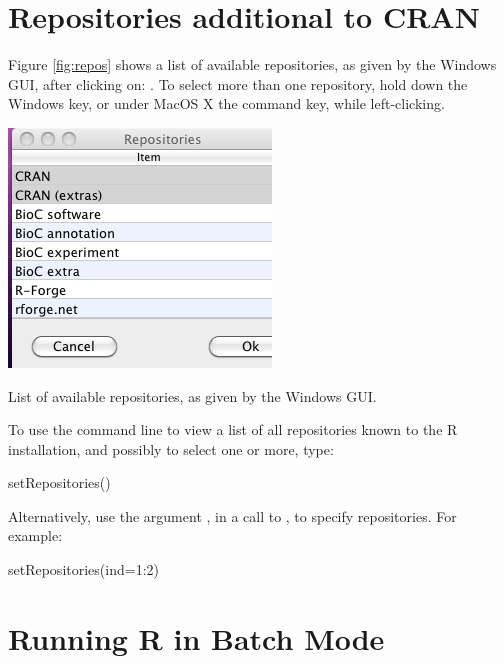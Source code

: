 \section{Repositories additional to CRAN}\label{sec:repos}

Figure \ref{fig:repos} shows a list of available repositories, as given by
the Windows GUI, after clicking on:
\txtt{|}.
To select more than one repository, hold down the Windows key, or
under MacOS X the command key, while left-clicking.

\begin{marginfigure}
\includegraphics{figs-inc/16i-repos.jpg}
\caption{List of available repositories, as given by the Windows
  GUI.}\label{fig:repos}
\end{marginfigure}

To use the command line to view a list of all repositories known to the R
installation, and possibly to select one or more, type:
\begin{Schunk}
\begin{Sinput}
setRepositories()
\end{Sinput}
\end{Schunk}
Alternatively, use the argument , in a call to
, to specify repositories.  For example:
\begin{Schunk}
\begin{Sinput}
setRepositories(ind=1:2)
\end{Sinput}
\end{Schunk}

\section{Running R in Batch Mode}


